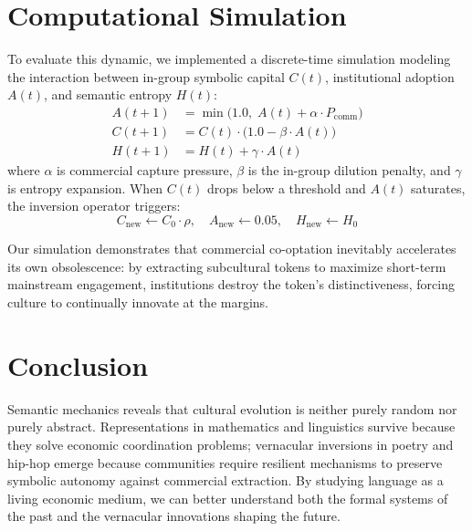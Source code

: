 \documentclass[11pt]{article}
\begin{document}
\section{Computational Simulation}

To evaluate this dynamic, we implemented a discrete-time simulation modeling the interaction between in-group symbolic capital $C(t)$, institutional adoption $A(t)$, and semantic entropy $H(t)$:
\begin{align}
    A(t+1) &= \min\big(1.0, \; A(t) + \alpha \cdot P_{\text{comm}}\big) \\
    C(t+1) &= C(t) \cdot \big(1.0 - \beta \cdot A(t)\big) \\
    H(t+1) &= H(t) + \gamma \cdot A(t)
\end{align}
where $\alpha$ is commercial capture pressure, $\beta$ is the in-group dilution penalty, and $\gamma$ is entropy expansion. When $C(t)$ drops below a threshold and $A(t)$ saturates, the inversion operator triggers:
\begin{equation}
    C_{\text{new}} \leftarrow C_0 \cdot \rho, \quad A_{\text{new}} \leftarrow 0.05, \quad H_{\text{new}} \leftarrow H_0
\end{equation}

Our simulation demonstrates that commercial co-optation inevitably accelerates its own obsolescence: by extracting subcultural tokens to maximize short-term mainstream engagement, institutions destroy the token's distinctiveness, forcing culture to continually innovate at the margins.

\section{Conclusion}

Semantic mechanics reveals that cultural evolution is neither purely random nor purely abstract. Representations in mathematics and linguistics survive because they solve economic coordination problems; vernacular inversions in poetry and hip-hop emerge because communities require resilient mechanisms to preserve symbolic autonomy against commercial extraction. By studying language as a living economic medium, we can better understand both the formal systems of the past and the vernacular innovations shaping the future.
\end{document}
